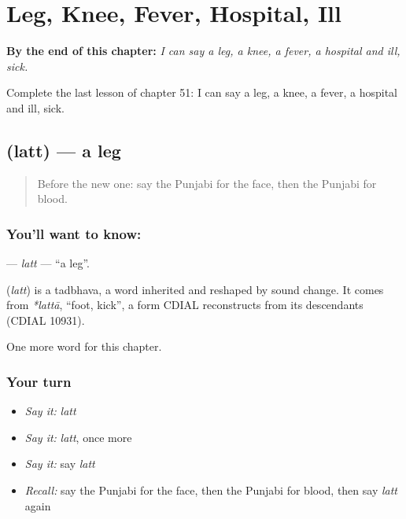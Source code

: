 
\chapter{Leg, Knee, Fever, Hospital, Ill}
\label{ch:pa-leg-knee-fever-hospital-ill}

\begin{chapteropening}
\textbf{By the end of this chapter:} \emph{I can say a leg, a knee, a fever, a hospital and ill, sick.}

Complete the last lesson of chapter 51: I can say a leg, a knee, a fever, a hospital and ill, sick.
\end{chapteropening}

\section[\texorpdfstring{\pa{ਲੱਤ} (latt)}{ਲੱਤ (latt)}]{ (latt) — a leg}

\label{lesson:PA-C51-latt}



\begin{quote}
Before the new one: say the Punjabi for the face, then the Punjabi for blood.
\end{quote}

\subsection*{You'll want to know: }
\textbf{} — \emph{latt} — \textquotedblleft{}a leg\textquotedblright{}.

\begin{cousinweb}
\textbf{} (\emph{latt}) is a tadbhava, a word inherited and reshaped by sound change. It comes from \emph{*lattā}, \textquotedblleft{}foot, kick\textquotedblright{}, a form CDIAL reconstructs from its descendants (CDIAL 10931).
\end{cousinweb}

\begin{grammarlens}[title={What you've built}]
One more word for this chapter.
\end{grammarlens}

\subsection*{Your turn}
\begin{itemize}
\raggedright
  \item \emph{Say it:} \emph{latt}
  \item \emph{Say it:} \emph{latt}, once more
  \item \emph{Say it:} say \emph{latt}
  \item \emph{Recall:} say the Punjabi for the face, then the Punjabi for blood, then say \emph{latt} again
\end{itemize}

